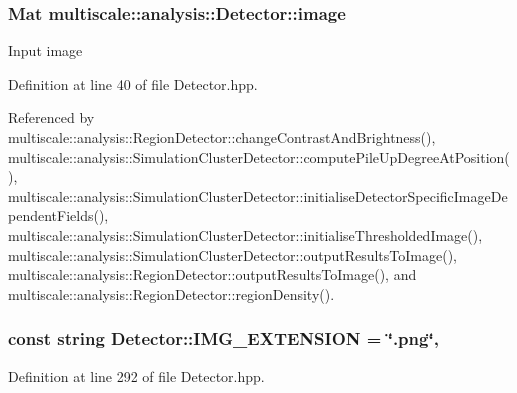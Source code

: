 \hypertarget{classmultiscale_1_1analysis_1_1Detector_a523830a6cfe409694ce8327c3c736fbd}{
\subsubsection[{image}]{\setlength{\rightskip}{0pt plus 5cm}Mat multiscale\-::analysis\-::\-Detector\-::image\hspace{0.3cm}{\ttfamily [protected]}}}\label{classmultiscale_1_1analysis_1_1Detector_a523830a6cfe409694ce8327c3c736fbd}
Input image 

Definition at line 40 of file Detector.\-hpp.



Referenced by multiscale\-::analysis\-::\-Region\-Detector\-::change\-Contrast\-And\-Brightness(), multiscale\-::analysis\-::\-Simulation\-Cluster\-Detector\-::compute\-Pile\-Up\-Degree\-At\-Position(), multiscale\-::analysis\-::\-Simulation\-Cluster\-Detector\-::initialise\-Detector\-Specific\-Image\-Dependent\-Fields(), multiscale\-::analysis\-::\-Simulation\-Cluster\-Detector\-::initialise\-Thresholded\-Image(), multiscale\-::analysis\-::\-Simulation\-Cluster\-Detector\-::output\-Results\-To\-Image(), multiscale\-::analysis\-::\-Region\-Detector\-::output\-Results\-To\-Image(), and multiscale\-::analysis\-::\-Region\-Detector\-::region\-Density().

\hypertarget{classmultiscale_1_1analysis_1_1Detector_acc73b4fb215305ffd7f3d6df8807cc5e}{
\subsubsection[{I\-M\-G\-\_\-\-E\-X\-T\-E\-N\-S\-I\-O\-N}]{\setlength{\rightskip}{0pt plus 5cm}const string Detector\-::\-I\-M\-G\-\_\-\-E\-X\-T\-E\-N\-S\-I\-O\-N = \char`\"{}.png\char`\"{}\hspace{0.3cm}{\ttfamily [static]}, {\ttfamily [protected]}}}\label{classmultiscale_1_1analysis_1_1Detector_acc73b4fb215305ffd7f3d6df8807cc5e}


Definition at line 292 of file Detector.\-hpp.


